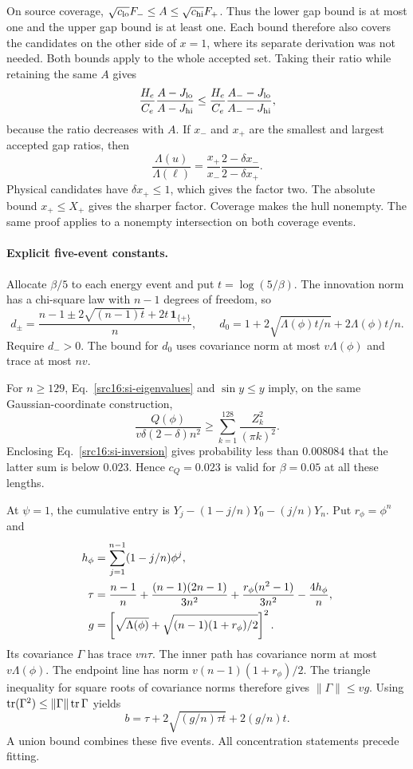 On source coverage, $\sqrt{c_{\rm lo}}F_-\le A\le\sqrt{c_{\rm hi}}F_+$. Thus the lower gap bound is at most one and the upper gap bound is at least one. Each bound therefore also covers the candidates on the other side of $x=1$, where its separate derivation was not needed. Both bounds apply to the whole accepted set. Taking their ratio while retaining the same $A$ gives
\[
 \frac{H_e}{C_e}\frac{A-J_{\rm lo}}{A-J_{\rm hi}}
 \le\frac{H_e}{C_e}\frac{A_--J_{\rm lo}}{A_--J_{\rm hi}},
\]
because the ratio decreases with $A$. If $x_-$ and $x_+$ are the smallest and largest accepted gap ratios, then
\[
 \frac{\Lambda(u)}{\Lambda(\ell)}
 =\frac{x_+}{x_-}\frac{2-\delta x_-}{2-\delta x_+}.
\]
Physical candidates have $\delta x_+\le1$, which gives the factor two. The absolute bound $x_+\le X_+$ gives the sharper factor. Coverage makes the hull nonempty. The same proof applies to a nonempty intersection on both coverage events.

\paragraph{Explicit five-event constants.}
Allocate $\beta/5$ to each energy event and put $t=\log(5/\beta)$. The innovation norm has a chi-square law with $n-1$ degrees of freedom, so
\begin{equation}\label{src16:si-dconstants}
 d_\pm=\frac{n-1\ \mathord{\pm}\ 2\sqrt{(n-1)t}
                       +2t\,\mathbf1_{\{+\}}}{n},\qquad
 d_0=1+2\sqrt{\Lambda(\phi)t/n}+2\Lambda(\phi)t/n.
\end{equation}
Require $d_->0$. The bound for $d_0$ uses covariance norm at most $v\Lambda(\phi)$ and trace at most $nv$.

For $n\ge129$, Eq.~\eqref{src16:si-eigenvalues} and $\sin y\le y$ imply, on the same Gaussian-coordinate construction,
\[
 \frac{Q(\phi)}{v\delta(2-\delta)n^2}
 \ge\sum_{k=1}^{128}\frac{Z_k^2}{(\pi k)^2}.
\]
Enclosing Eq.~\eqref{src16:si-inversion} gives probability less than $0.008084$ that the latter sum is below $0.023$. Hence $c_Q=0.023$ is valid for $\beta=0.05$ at all these lengths.

At $\psi=1$, the cumulative entry is
$Y_j-(1-j/n)Y_0-(j/n)Y_n$. Put $r_\phi=\phi^n$ and
\begin{align}\label{src16:si-endpoint-moments}
 h_\phi&=\sum_{j=1}^{n-1}(1-j/n)\phi^j,\notag\\
 \tau&=\frac{n-1}{n}+\frac{(n-1)(2n-1)}{3n^2}
       +\frac{r_\phi(n^2-1)}{3n^2}-\frac{4h_\phi}{n},\notag\\
 g&=\left[\sqrt{\Lambda(\phi)}+\sqrt{(n-1)(1+r_\phi)/2}\right]^2.
\end{align}
Its covariance $\Gamma$ has trace $vn\tau$. The inner path has covariance norm at most $v\Lambda(\phi)$. The endpoint line has norm $v(n-1)(1+r_\phi)/2$. The triangle inequality for square roots of covariance norms therefore gives $\|\Gamma\|\le vg$. Using $\operatorname{tr}(\Gamma^2)\le\|\Gamma\|\operatorname{tr}\Gamma$ yields
\begin{equation}\label{src16:si-bconstant}
 b=\tau+2\sqrt{(g/n)\tau t}+2(g/n)t.
\end{equation}
A union bound combines these five events. All concentration statements precede fitting.

